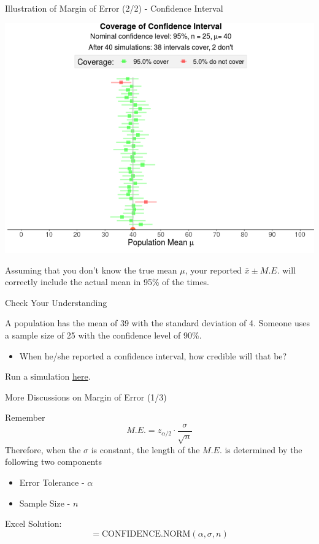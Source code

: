 \documentclass{beamer}
\begin{document}
\begin{frame}{Illustration of Margin of Error (2/2) - Confidence Interval}

\begin{center}
\includegraphics[width = 230 px]{images/section5ConfidenceIntervalMu.png}
\end{center}

Assuming that you don't know the true mean $\mu$, your reported $\bar{x} \pm M.E.$ will correctly include the actual mean in 95\% of the times. 

\end{frame}


\begin{frame}{Check Your Understanding}


A population has the mean of 39 with the standard deviation of 4.  Someone uses a sample size of 25 with the confidence level of 90\%. 
\begin{itemize}
\item When he/she reported a confidence interval, how credible will that be? 
\end{itemize}

Run a simulation \href{https://istats.shinyapps.io/ExploreCoverage/}{here}.

\end{frame}





\begin{frame}{More Discussions on Margin of Error (1/3)}

Remember 
$$ M.E. = z_{\alpha/2} \cdot \frac{\sigma}{\sqrt{n}} $$
Therefore, when the $\sigma$ is constant, the length of the $M.E.$ is determined by the following two components 
\begin{itemize}
\item Error Tolerance - $\alpha$
\item Sample Size - $n$
\end{itemize}

\vspace{0.3 cm}
Excel Solution: 
$$ =\text{CONFIDENCE.NORM}(\alpha, \sigma, n)$$

\end{frame}
\end{document}
